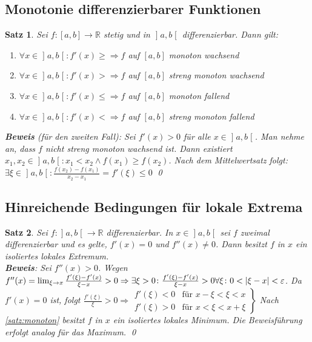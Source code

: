 \documentclass[ngerman,titlepage,twoside, parskip=half*]{scrreprt}
\newcommand*{\R}{\mathbb{R}}
\theoremstyle{break}
\newtheorem{theorem}{Satz}[section]
\theoremstyle{nonumberbreak}
\DeclarePairedDelimiter{\abs}{\lvert}{\rvert}
\newcommand*{\bsofint}[1]{\mathopen{]}#1\mathclose{[}} %
\begin{document}
\subsection{Monotonie differenzierbarer Funktionen}
\begin{theorem}
  \label{satz:monoton}
  Sei $f\colon[a,b]\rightarrow\R$ stetig und in $\bsofint{a,b}$ differenzierbar. Dann
  gilt:
  \begin{enumerate}
    \item $\forall x \in \bsofint{a,b}\colon f'(x)\geq \Rightarrow f$ auf $[a,b]$
      monoton wachsend
    \item $\forall x \in \bsofint{a,b}\colon f'(x)> \Rightarrow f$ auf $[a,b]$ 
      streng monoton wachsend
    \item $\forall x \in \bsofint{a,b}\colon f'(x)\leq \Rightarrow f$ auf $[a,b]$
      monoton fallend
    \item $\forall x \in \bsofint{a,b}\colon f'(x)< \Rightarrow f$ auf $[a,b]$
      streng monoton fallend
  \end{enumerate}
  \textbf{Beweis} (für den zweiten Fall): Sei $f'(x)>0$ für alle $x\in
  \bsofint{a,b}$. Man nehme an, dass $f$ nicht streng monoton wachsend ist. Dann
  existiert $x_1,x_2\in\bsofint{a,b}\colon x_1<x_2\wedge f(x_1)\geq f(x_2)$. Nach dem
  Mittelwertsatz folgt: $\exists \xi\in\bsofint{a,b}\colon\frac{f(x_2)-f(x_1)}{x_2-x_1}
  =f'(\xi)\leq 0$\textnormal{\lightning}
  \qed
\end{theorem}

\subsection{Hinreichende Bedingungen für lokale Extrema}
\begin{theorem}
  \label{satz:lokExtrema}
  Sei $f\colon\bsofint{a,b}\rightarrow\R$ differenzierbar. In $x \in \bsofint{a,b}$ sei $f$
  zweimal differenzierbar und es gelte, $f'(x)=0$ und $f''(x)\neq 0$.
  Dann besitzt $f$ in $x$ ein isoliertes lokales Extremum.\\
  \textbf{Beweis}: Sei $f''(x)>0$. Wegen $f''(x)=\lim_{\xi\rightarrow x}
  \frac{f'(\xi)-f'(x)}{\xi-x}>0\Rightarrow\exists\xi>0\colon
  \frac{f'(\xi)-f'(x)}{\xi-x}>0 \forall\xi\colon0<\abs{\xi-x}<\varepsilon$.
  Da $f'(x)=0$ ist, folgt $\frac{f'(\xi)}{\xi}>0\Rightarrow
  \left.
  \begin{array}{rcl}
    f'(\xi)<0 & \text{für } x-\xi<\xi<x\\
    f'(\xi)>0 & \text{für } x<\xi<x+\xi
  \end{array}\right\}$ Nach \autoref{satz:monoton} besitzt $f$ in $x$
  ein isoliertes lokales Minimum. Die Beweisführung erfolgt analog für
  das Maximum.
  \qed
\end{theorem}
\end{document}
